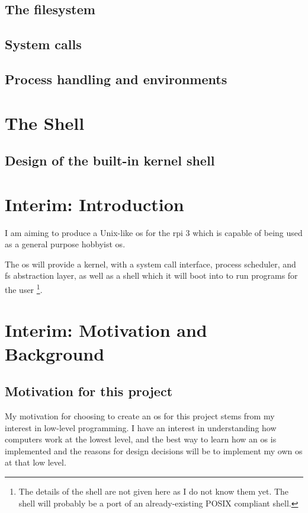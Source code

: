 \documentclass{article}
\begin{document}
\subsection{The filesystem}
\subsection{System calls}
\subsection{Process handling and environments}

\clearpage
\section{The Shell}
\subsection{Design of the built-in kernel shell}

\clearpage
\section{Interim: Introduction}
I am aiming to produce a Unix-like \gls{os} for the \gls{rpi} 3 which is
capable of being used as a general purpose hobbyist \gls{os}.

The \gls{os} will provide a kernel, with a system call interface, process
scheduler, and \gls{fs} abstraction layer, as well as a shell which it will
boot into to run programs for the user
\footnote{The details of the shell are not given here as I do not know them
yet. The shell will probably be a port of an already-existing POSIX compliant
shell.}.


\section{Interim: Motivation and Background}
\subsection{Motivation for this project}
My motivation for choosing to create an \gls{os} for this project stems from my
interest in low-level programming. I have an interest in understanding how
computers work at the lowest level, and the best way to learn how an \gls{os}
is implemented and the reasons for design decisions will be to implement my own
\gls{os} at that low level.
\end{document}
